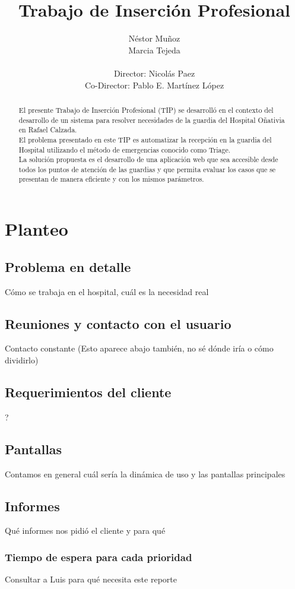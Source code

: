 \documentclass[a4paper,10pt]{article}
\title{Trabajo de Inserción Profesional}
\author{Néstor Muñoz\\ Marcia Tejeda\\ \\ Director: Nicolás Paez \\  Co-Director: Pablo E. Martínez López}
\begin{document}
\maketitle
\newpage 
\begin{abstract}
El presente Trabajo de Inserción Profesional (TIP) se desarrolló en el contexto del desarrollo de un sistema para resolver necesidades de la guardia del Hospital Oñativia en Rafael Calzada.\\ 
El problema presentado en este TIP es automatizar la recepción en la guardia del Hospital utilizando el método de emergencias conocido como Triage.\\ 
La solución propuesta es el desarrollo de una aplicación web que sea accesible desde todos los puntos de atención de las guardias y que permita evaluar los casos que se presentan de manera eficiente y con los mismos parámetros.

\end{abstract}


\newpage 
\tableofcontents


\newpage 


\newpage 
\section{Planteo}
\subsection{Problema en detalle}
Cómo se trabaja en el hospital, cuál es la necesidad real
\subsection{Reuniones y contacto con el usuario}
Contacto constante (Esto aparece abajo también, no sé dónde iría o cómo dividirlo)
\subsection{Requerimientos del cliente}
?
\subsection{Pantallas}
Contamos en general cuál sería la dinámica de uso y las pantallas principales
\subsection{Informes}
Qué informes nos pidió el cliente y para qué
\subsubsection{Tiempo de espera para cada prioridad}
Consultar a Luis para qué necesita este reporte
\end{document}
